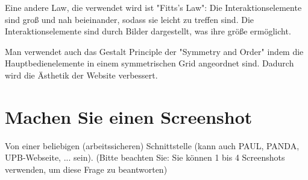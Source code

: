 \documentclass[a4paper,12pt]{article}
\begin{document}
\begin{itemize}[label=a)]
        Eine andere Law, die verwendet wird ist "Fitts’s Law": Die Interaktionselemente
        sind groß und nah beieinander, sodass sie leicht zu treffen sind. Die Interaktionselemente
        sind durch Bilder dargestellt, was ihre größe ermöglicht.

        Man verwendet auch das Gestalt Principle der "Symmetry and Order" indem die
        Hauptbedienelemente in einem symmetrischen Grid angeordnet sind. Dadurch
        wird die Ästhetik der Website verbessert.
\end{itemize}

\section{Machen Sie einen Screenshot}

Von einer beliebigen (arbeitssicheren) Schnittstelle
(kann auch PAUL, PANDA, UPB-Webseite, ... sein). (Bitte beachten Sie: Sie können
1 bis 4 Screenshots verwenden, um diese Frage zu beantworten)

\end{document}
